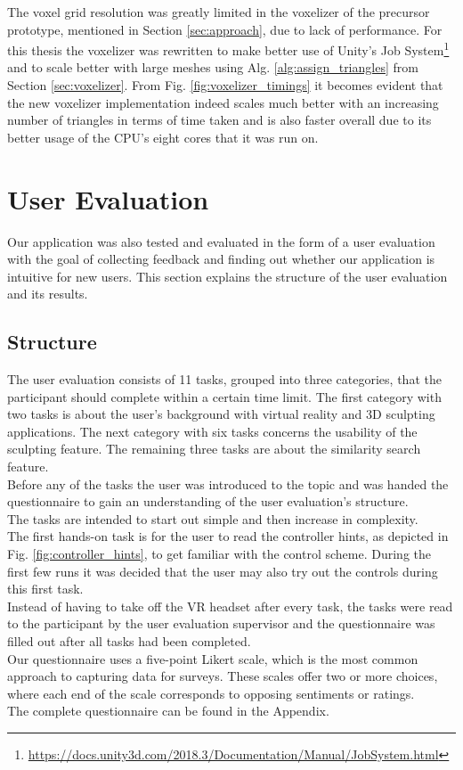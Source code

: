 The voxel grid resolution was greatly limited in the voxelizer of the precursor prototype, mentioned in Section \ref{sec:approach}, due to lack of performance. For this thesis the voxelizer was rewritten to make better use of Unity's Job System\footnote{\url{https://docs.unity3d.com/2018.3/Documentation/Manual/JobSystem.html}} and to scale better with large meshes using Alg. \ref{alg:assign_triangles} from Section \ref{sec:voxelizer}. From Fig. \ref{fig:voxelizer_timings} it becomes evident that the new voxelizer implementation indeed scales much better with an increasing number of triangles in terms of time taken and is also faster overall due to its better usage of the CPU's eight cores that it was run on.

\section{User Evaluation}

Our application was also tested and evaluated in the form of a user evaluation with the goal of collecting feedback and finding out whether our application is intuitive for new users. This section explains the structure of the user evaluation and its results.

\subsection{Structure}

The user evaluation consists of 11 tasks, grouped into three categories, that the participant should complete within a certain time limit. The first category with two tasks is about the user's background with virtual reality and 3D sculpting applications. The next category with six tasks concerns the usability of the sculpting feature. The remaining three tasks are about the similarity search feature.\\
Before any of the tasks the user was introduced to the topic and was handed the questionnaire to gain an understanding of the user evaluation's structure.\\
The tasks are intended to start out simple and then increase in complexity.\\
The first hands-on task is for the user to read the controller hints, as depicted in Fig. \ref{fig:controller_hints}, to get familiar with the control scheme. During the first few runs it was decided that the user may also try out the controls during this first task.\\
Instead of having to take off the VR headset after every task, the tasks were read to the participant by the user evaluation supervisor and the questionnaire was filled out after all tasks had been completed.\\
Our questionnaire uses a five-point Likert scale, which is the most common approach to capturing data for surveys. These scales offer two or more choices, where each end of the scale corresponds to opposing sentiments or ratings.\\
The complete questionnaire can be found in the Appendix.

